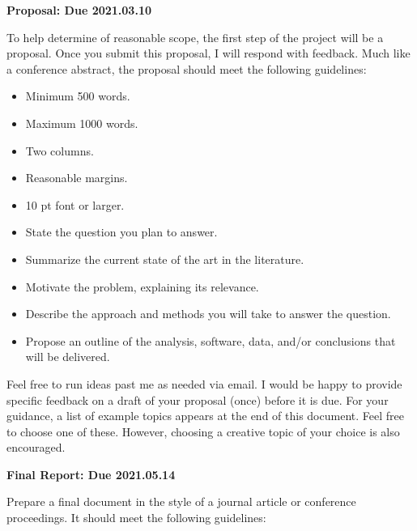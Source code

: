 \documentclass[12pts, answers]{exam}
\newcommand{\duedate}{2021.05.14}
\begin{document}
\begin{questions}
\addpoints
\question[10] \textbf{Proposal: Due 2021.03.10}

To help determine of reasonable scope, the first step of the project will be a
proposal. Once you submit this proposal, I will respond with feedback. Much
like a conference abstract, the proposal should meet the following guidelines:

\begin{itemize}
\item Minimum 500 words.
\item Maximum 1000 words.
\item Two columns.
\item Reasonable margins.
\item 10 pt font or larger.
\item State the question you plan to answer.
\item Summarize the current state of the art in the literature.
\item Motivate the problem, explaining its relevance.
\item Describe the approach and methods you will take to answer the question.
\item Propose an outline of the analysis, software, data, and/or conclusions that will be delivered.
\end{itemize}

Feel free to run ideas past me as needed via email. I would be happy to provide 
        specific feedback on a draft of your proposal (once) before it is due. 
        For your guidance, a list of example topics appears at the end of this 
        document. Feel free to choose one of these.  However, choosing a 
        creative topic of your choice is also encouraged.


\question[90] \textbf{Final Report: Due \duedate}

Prepare a final document in the style of a journal article or conference
proceedings. It should meet the following guidelines:


\end{questions}
\end{document}
